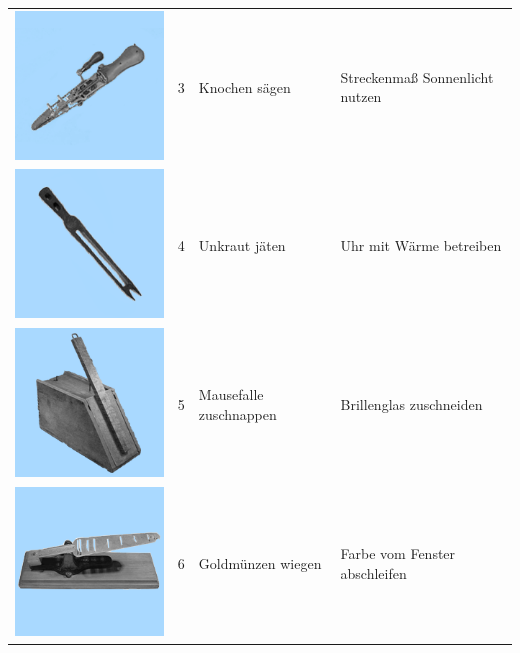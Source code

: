 \documentclass[
  english,
  man,floatsintext]{apa7}
\begin{document}
\begin{center}
\begin{ThreePartTable}
\begin{longtable}{llll}
\includegraphics[valign=c, scale=0.19]{../materials/unfamiliar/3.png} & 3 & Knochen sägen & Streckenmaß Sonnenlicht nutzen\\
\includegraphics[valign=c, scale=0.19]{../materials/unfamiliar/4.png} & 4 & Unkraut jäten & Uhr mit Wärme betreiben\\
\includegraphics[valign=c, scale=0.19]{../materials/unfamiliar/5.png} & 5 & Mausefalle zuschnappen & Brillenglas zuschneiden\\
\includegraphics[valign=c, scale=0.19]{../materials/unfamiliar/6.png} & 6 & Goldmünzen wiegen & Farbe vom Fenster abschleifen\\

\end{longtable}
\end{ThreePartTable}
\end{center}
\end{document}
